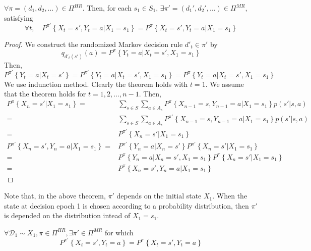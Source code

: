 \begin{theorem}
    $ \forall \pi = (d_1, d_2, \ldots) \in \Pi^{HR} $. Then, for each $ s_1 \in S_1 $, $ \exists \pi' = (d_1', d_2', \ldots) \in \Pi^{MR} $, satisfying
    \begin{equation}
        \forall t,\quad P^{\pi'} \left\{ X_t = s', Y_t = a | X_1 = s_1 \right\} = P^\pi \left\{ X_t = s', Y_t = a | X_1 = s_1 \right\}
    \end{equation}
    \begin{proof}
        We construct the randomized Markov decision rule $ d'_t \in \pi' $ by
        \[
            q_{d'_t(s')}(a) = P^\pi \left\{ Y_t = a | X_t = s', X_1 = s_1 \right\}
        \]
        Then,
        \[
            P^{\pi'} \left\{ Y_t = a | X_t = s' \right\}
            = P^{\pi'} \left\{ Y_t = a | X_t = s', X_1 = s_1 \right\}
            = P^{\pi} \left\{ Y_t = a | X_t = s', X_1 = s_1 \right\}
        \]
        We use indunction method. Clearly the theorem holds with $ t = 1 $. We assume that the theorem holds for $ t = 1, 2, \ldots, n-1 $. Then,
        \begin{align*}
            P^\pi \left\{ X_n = s' | X_1 = s_1 \right\}
            =& \sum^{}_{s \in S} \sum^{}_{a \in A_s} P^\pi \left\{ X_{n-1} = s, Y_{n-1} = a | X_1 = s_1 \right\} p(s' | s, a)\\
            =& \sum^{}_{s \in S} \sum^{}_{a \in A_s} P^{\pi'} \left\{ X_{n-1} = s, Y_{n-1} = a | X_1 = s_1 \right\} p(s' | s, a)\\
            =& P^{\pi'} \left\{ X_n = s' | X_1 = s_1 \right\}\\
            P^{\pi'} \left\{ X_n = s', Y_n = a | X_1 = s_1 \right\} 
            =& P^{\pi'} \left\{ Y_n = a | X_n = s' \right\} P^{\pi'} \left\{ X_n = s' | X_1 = s_1 \right\}\\
            =& P^{\pi} \left\{ Y_n = a | X_n = s', X_1 = s_1 \right\} P^{\pi} \left\{ X_n = s' | X_1 = s_1 \right\}\\
            =& P^{\pi} \left\{ X_n = s', Y_n = a | X_1 = s_1 \right\}
        \end{align*}
    \end{proof}
\end{theorem}
Note that, in the above theorem, $ \pi' $ depends on the initial state $ X_1 $.
When the state at decision epoch 1 is chosen according to a probability distribution, 
then $ \pi' $ is depended on the distribution intead of $ X_1 = s_1 $.
\begin{corollary}
    $ \forall \mathcal{D}_1 \sim X_1, \pi \in \Pi^{HR}, \exists \pi' \in \Pi^{MR} $ for which
    \[
        P^{\pi'} \left\{ X_t = s', Y_t = a \right\} = P^{\pi} \left\{ X_t = s', Y_t = a \right\}
    \]
\end{corollary}

